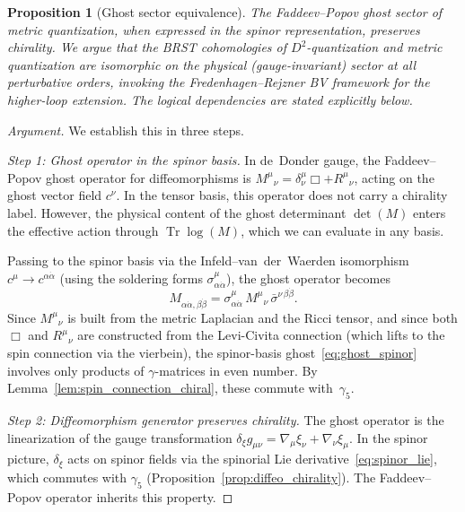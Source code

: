 \documentclass[12pt,a4paper]{article}
\newtheorem{proposition}[theorem]{Proposition}
\theoremstyle{definition}
\theoremstyle{remark}
\newcommand{\Tr}{\operatorname{Tr}}
\begin{document}
\begin{proposition}[Ghost sector equivalence]
\label{thm:ghost_equivalence}
The Faddeev--Popov ghost sector of metric quantization, when expressed in
the spinor representation, preserves chirality.  We argue that the BRST
cohomologies of $D^2$-quantization and metric quantization are isomorphic
on the physical (gauge-invariant) sector at all perturbative orders, invoking
the Fredenhagen--Rejzner BV framework for the higher-loop extension.  The
logical dependencies are stated explicitly below.
\end{proposition}

\begin{proof}[Argument]
We establish this in three steps.

\smallskip\noindent\emph{Step 1: Ghost operator in the spinor basis.}
In de~Donder gauge, the Faddeev--Popov ghost operator for
diffeomorphisms is $M^\mu{}_\nu = \delta^\mu_\nu\Box + R^\mu{}_\nu$,
acting on the ghost vector field $c^\nu$.  In the tensor basis, this
operator does not carry a chirality label.  However, the physical
content of the ghost determinant $\det(M)$ enters the effective action
through $\Tr\log(M)$, which we can evaluate in any basis.

Passing to the spinor basis via the Infeld--van~der~Waerden isomorphism
$c^\mu \to c^{\alpha\dot\alpha}$ (using the soldering forms
$\sigma^\mu_{\alpha\dot\alpha}$), the ghost operator becomes
\begin{equation}\label{eq:ghost_spinor}
  M_{\alpha\dot\alpha,\beta\dot\beta}
  = \sigma^\mu_{\alpha\dot\alpha}\,M^\mu{}_\nu\,
    \bar\sigma^{\nu\,\beta\dot\beta}.
\end{equation}
Since $M^\mu{}_\nu$ is built from the metric Laplacian and the Ricci
tensor, and since both $\Box$ and $R^\mu{}_\nu$ are constructed from
the Levi-Civita connection (which lifts to the spin connection via the
vierbein), the spinor-basis ghost~\eqref{eq:ghost_spinor} involves only
products of $\gamma$-matrices in even number.  By
Lemma~\ref{lem:spin_connection_chiral}, these commute with~$\gamma_5$.

\smallskip\noindent\emph{Step 2: Diffeomorphism generator preserves chirality.}
The ghost operator is the linearization of the gauge transformation
$\delta_\xi g_{\mu\nu} = \nabla_\mu\xi_\nu + \nabla_\nu\xi_\mu$.
In the spinor picture, $\delta_\xi$ acts on spinor fields via
the spinorial Lie derivative~\eqref{eq:spinor_lie}, which commutes
with $\gamma_5$ (Proposition~\ref{prop:diffeo_chirality}).  The
Faddeev--Popov operator inherits this property.


\end{proof}
\end{document}
